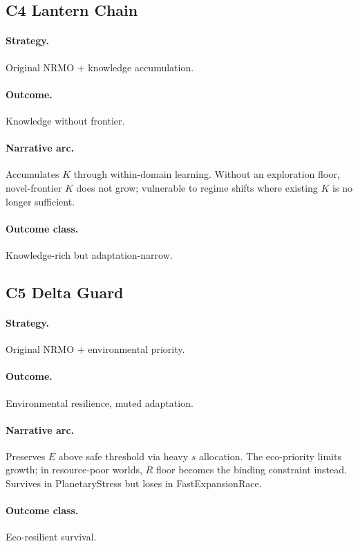 \subsection{C4 Lantern Chain}
\label{civ:c4}

\paragraph{Strategy.} Original NRMO + knowledge accumulation.
\paragraph{Outcome.} Knowledge without frontier.
\paragraph{Narrative arc.}
Accumulates $K$ through within-domain learning. Without an
exploration floor, novel-frontier $K$ does not grow; vulnerable to
regime shifts where existing $K$ is no longer sufficient.
\paragraph{Outcome class.} Knowledge-rich but adaptation-narrow.

\subsection{C5 Delta Guard}
\label{civ:c5}

\paragraph{Strategy.} Original NRMO + environmental priority.
\paragraph{Outcome.} Environmental resilience, muted adaptation.
\paragraph{Narrative arc.}
Preserves $E$ above safe threshold via heavy $s$ allocation.
The eco-priority limits growth; in resource-poor worlds, $R$ floor
becomes the binding constraint instead. Survives in PlanetaryStress
but loses in FastExpansionRace.
\paragraph{Outcome class.} Eco-resilient survival.

